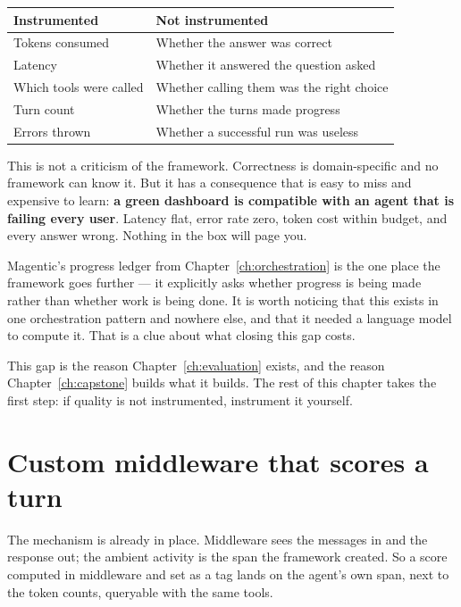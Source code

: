 \begin{center}
\small
\begin{tabularx}{\linewidth}{@{}lX@{}}
\toprule
\textbf{Instrumented} & \textbf{Not instrumented} \\
\midrule
Tokens consumed & Whether the answer was correct \\
Latency & Whether it answered the question asked \\
Which tools were called & Whether calling them was the right choice \\
Turn count & Whether the turns made progress \\
Errors thrown & Whether a successful run was useless \\
\bottomrule
\end{tabularx}
\end{center}

This is not a criticism of the framework. Correctness is domain-specific and no
framework can know it. But it has a consequence that is easy to miss and
expensive to learn: \textbf{a green dashboard is compatible with an agent that is
failing every user}. Latency flat, error rate zero, token cost within budget, and
every answer wrong. Nothing in the box will page you.

\begin{note}
Magentic's progress ledger from Chapter~\ref{ch:orchestration} is the one place
the framework goes further --- it explicitly asks whether progress is being made
rather than whether work is being done. It is worth noticing that this exists in
one orchestration pattern and nowhere else, and that it needed a language model
to compute it. That is a clue about what closing this gap costs.
\end{note}

This gap is the reason Chapter~\ref{ch:evaluation} exists, and the reason
Chapter~\ref{ch:capstone} builds what it builds. The rest of this chapter takes
the first step: if quality is not instrumented, instrument it yourself.

\section{Custom middleware that scores a turn}
\label{sec:obs-scoring}

The mechanism is already in place. Middleware sees the messages in and the
response out; the ambient activity is the span the framework created. So a score
computed in middleware and set as a tag lands on the agent's own span, next to
the token counts, queryable with the same tools.

